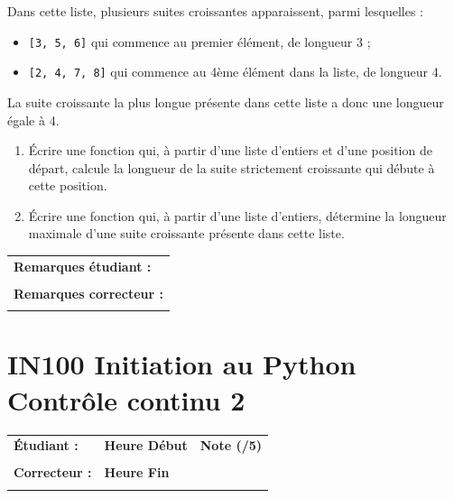 \documentclass[a4paper,11pt]{article}
\begin{document}
Dans cette liste, plusieurs suites  croissantes apparaissent, parmi lesquelles :

\begin{itemize}
    \item \texttt{[3, 5, 6]} qui commence au premier élément, de longueur 3 ;
    \item \texttt{[2, 4, 7, 8]} qui commence  au 4ème élément dans la liste, de longueur 4.
\end{itemize}

La suite croissante la plus longue présente dans cette liste a donc une longueur égale à 4.

\vspace{-0.3 cm}


\begin{enumerate}
  \item[1.] Écrire une fonction qui, à partir d'une liste d'entiers et d'une position de départ, calcule la longueur de la suite strictement croissante qui débute à cette position.
  
  \item[2.] Écrire une fonction qui, à partir d'une liste d'entiers, détermine la longueur maximale d'une suite croissante présente dans cette liste.
\end{enumerate}

\vspace{-0.4 cm}
\begin{table}[h!]
\centering
\renewcommand{\arraystretch}{1.4} %
\begin{tabular}{|p{15cm}|}
\hline
\textbf{Remarques étudiant :}    \\
 \\
\hline
\textbf{Remarques correcteur :}  \\
 \\
\hline
\end{tabular}
\end{table}


\newpage


\section*{\center IN100 Initiation au Python\\
Contrôle continu 2}

\vspace{-0.3 cm}

\begin{table}[h!]
\centering
\renewcommand{\arraystretch}{1.4} %
\begin{tabular}{|p{10cm}|p{3cm}|p{2cm}|}
\hline
\textbf{Étudiant :} & \textbf{Heure Début }  & \textbf{Note (/5) }  \\
& & \\
\hline
\textbf{Correcteur :} & \textbf{Heure Fin } & \\
& & \\
\hline

\hline
\end{tabular}
\end{table}
\vspace{-0.4 cm}
\end{document}
